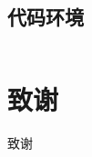 \documentclass[a4paper,punct=banjiao,twoside]{ctexrep}
\theoremstyle{plain}
\theoremstyle{definition}
\theoremstyle{remark}
\begin{document}
\section{代码环境}
\begin{lstlisting}[language=PYTHON]

\end{lstlisting}

\clearpage
\mbox{}
\thispagestyle{empty}


% 



\clearpage
\mbox{}
\thispagestyle{empty}

\chapter*{致\quad 谢}
\normalsize
致谢
\end{document}
